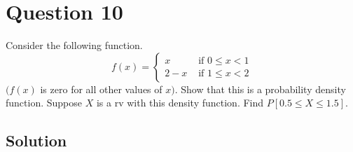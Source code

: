 \section*{Question 10}

Consider the following function.
\begin{equation*}
    f(x)= \begin{cases}x & \text { if } 0 \leq x<1 \\ 2-x & \text { if } 1 \leq x<2\end{cases}
\end{equation*}
\( (f(x) \) is zero for all other values of \( x) \).
Show that this is a probability density function.
Suppose \( X \) is a rv with this density function.
Find \( P[0.5 \leq X \leq 1.5] \).

\subsection*{Solution}
